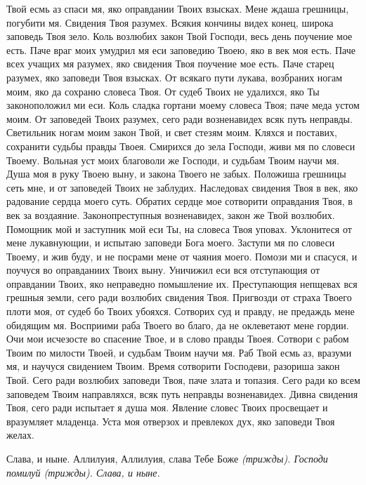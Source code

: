 Твой есмь аз спаси мя, яко оправдании Твоих взысках. Мене ждаша грешницы, погубити мя. Свидения Твоя разумех. Всякия кончины видех конец, широка заповедь Твоя зело. Коль возлюбих закон Твой Господи, весь день поучение мое есть. Паче враг моих умудрил мя еси заповедию Твоею, яко в век моя есть. Паче всех учащих мя разумех, яко свидения Твоя поучение мое есть. Паче старец разумех, яко заповеди Твоя взысках. От всякаго пути лукава, возбраних ногам моим, яко да сохраню словеса Твоя. От судеб Твоих не удалихся, яко Ты законоположил ми еси. Коль сладка гортани моему словеса Твоя; паче меда устом моим. От заповедей Твоих разумех, сего ради возненавидех всяк путь неправды. Светильник ногам моим закон Твой, и свет стезям моим. Кляхся и поставих, сохранити судьбы правды Твоея. Смирихся до зела Господи, живи мя по словеси Твоему. Вольная уст моих благоволи же Господи, и судьбам Твоим научи мя. Душа моя в руку Твоею выну, и закона Твоего не забых. Положиша грешницы сеть мне, и от заповедей Твоих не заблудих. Наследовах свидения Твоя в век, яко радование сердца моего суть. Обратих сердце мое сотворити оправдания Твоя, в век за воздаяние. Законопреступныя возненавидех, закон же Твой возлюбих. Помощник мой и заступник мой еси Ты, на словеса Твоя уповах. Уклонитеся от мене лукавнующии, и испытаю заповеди Бога моего. Заступи мя по словеси Твоему, и жив буду, и не посрами мене от чаяния моего. Помози ми и спасуся, и поучуся во оправданиих Твоих выну. Уничижил еси вся отступающия от оправдании Твоих, яко неправедно помышление их. Преступающия непщевах вся грешныя земли, сего ради возлюбих свидения Твоя. Пригвозди от страха Твоего плоти моя, от судеб бо Твоих убояхся. Сотворих суд и правду, не предаждь мене обидящим мя. Восприими раба Твоего во благо, да не оклеветают мене гордии. Очи мои исчезосте во спасение Твое, и в слово правды Твоея. Сотвори с рабом Твоим по милости Твоей, и судьбам Твоим научи мя. Раб Твой есмь аз, вразуми мя, и научуся свидением Твоим. Время сотворити Господеви, разориша закон Твой. Сего ради возлюбих заповеди Твоя, паче злата и топазия. Сего ради ко всем заповедем Твоим направляхся, всяк путь неправды возненавидех. Дивна свидения Твоя, сего ради испытает я душа моя. Явление словес Твоих просвещает и вразумляет младенца. Уста моя отверзох и превлекох дух, яко заповеди Твоя желах.


Слава, и ныне. Аллилуия, Аллилуия, слава Тебе Боже \itshape (трижды)\normalfont{}. Господи помилуй \itshape (трижды)\normalfont{}. Слава, и ныне.


